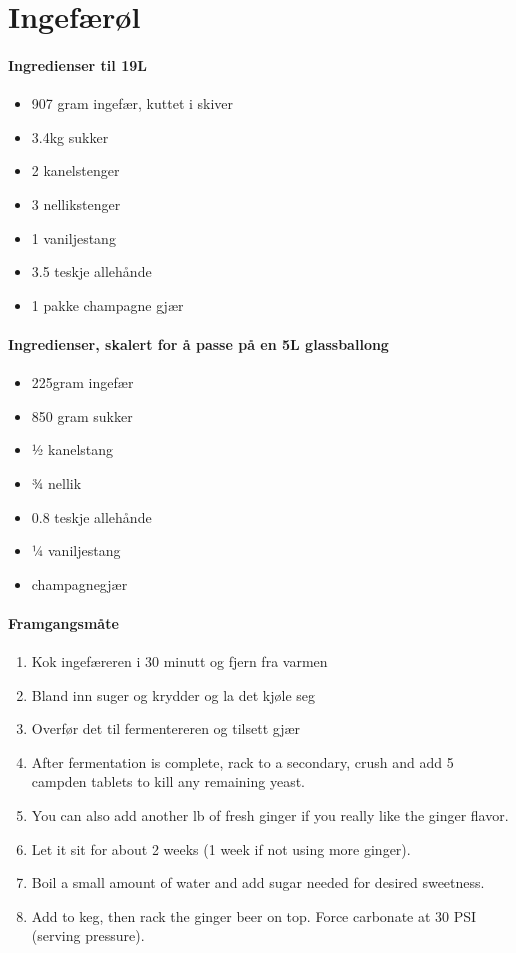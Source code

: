 \section{Ingefærøl}


\paragraph{Ingredienser til 19L}
\begin{itemize}[noitemsep]
	\item 907 gram ingefær, kuttet i skiver
	\item 3.4kg sukker
	\item 2 kanelstenger
	\item 3 nellikstenger
	\item 1 vaniljestang
	\item 3.5 teskje allehånde
	\item 1 pakke champagne gjær
\end{itemize}

\paragraph{Ingredienser, skalert for å passe på en 5L glassballong}
\begin{itemize}[noitemsep]
	\item 225gram ingefær
	\item 850 gram sukker
	\item ½ kanelstang
	\item ¾ nellik
	\item 0.8 teskje allehånde
	\item ¼ vaniljestang
	\item champagnegjær
\end{itemize}

\paragraph{Framgangsmåte}
\begin{enumerate}[noitemsep]
	\item Kok ingefæreren i 30 minutt og fjern fra varmen
	\item Bland inn suger og krydder og la det kjøle seg
	\item Overfør det til fermentereren og tilsett gjær

	\item After fermentation is complete, rack to a secondary, crush and add 5 campden tablets to kill any remaining yeast.
	\item You can also add another lb of fresh ginger if you really like the ginger flavor.
	\item Let it sit for about 2 weeks (1 week if not using more ginger).
	\item Boil a small amount of water and add sugar needed for desired sweetness.
	\item Add to keg, then rack the ginger beer on top. Force carbonate at 30 PSI (serving pressure).
\end{enumerate}




